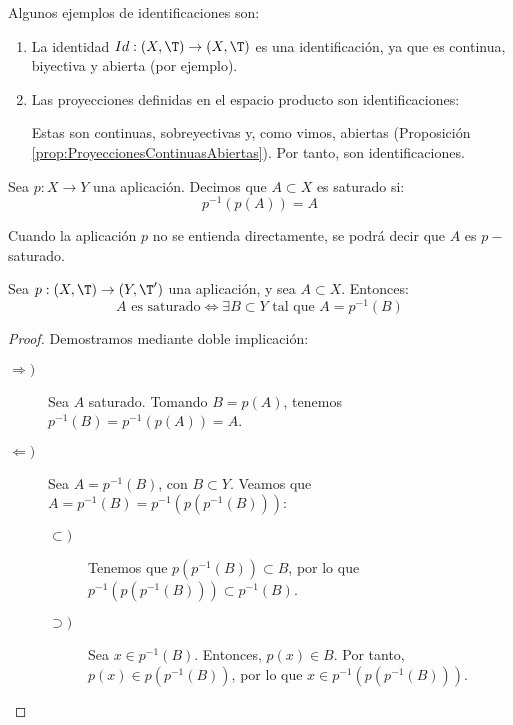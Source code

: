 \begin{ejemplo} Algunos ejemplos de identificaciones son:
\begin{enumerate}
    \item La identidad $Id:(X,\T)\to (X,\T)$ es una identificación, ya que es continua, biyectiva y abierta (por ejemplo).
    \item Las proyecciones definidas en el espacio producto son identificaciones:

        Estas son continuas, sobreyectivas y, como vimos, abiertas (Proposición \ref{prop:ProyeccionesContinuasAbiertas}). Por tanto, son identificaciones.
\end{enumerate}
\end{ejemplo}


\begin{definicion}
    Sea $p:X\to Y$ una aplicación. Decimos que $A\subset X$ es saturado si:
    \begin{equation*}
        p^{-1}(p(A))=A
    \end{equation*}

    Cuando la aplicación $p$ no se entienda directamente, se podrá decir que $A$ es $p-$saturado.
\end{definicion}
\begin{prop}
    Sea $p:(X,\T)\to (Y,\T')$ una aplicación, y sea $A\subset X$. Entonces:
    \begin{equation*}
        A \text{ es saturado} \Longleftrightarrow \exists B\subset Y \text{ tal que } A=p^{-1}(B)
    \end{equation*}
\end{prop}
\begin{proof}
    Demostramos mediante doble implicación:
    \begin{description}
        \item[$\Longrightarrow)$] Sea $A$ saturado. Tomando $B=p(A)$, tenemos $p^{-1}(B)=p^{-1}(p(A))=A$.
        \item[$\Longleftarrow)$] Sea $A=p^{-1}(B)$, con $B\subset Y$. Veamos que $A=p^{-1}(B) = p^{-1}(p(p^{-1}(B)))$:
        \begin{description}
            \item[$\subset)$] Tenemos que $p(p^{-1}(B))\subset B$, por lo que
            $p^{-1}(p(p^{-1}(B)))\subset p^{-1}(B)$.

            \item[$\supset)$] Sea $x\in p^{-1}(B)$. Entonces,
            $p(x)\in B$. Por tanto, $p(x)\in p(p^{-1}(B))$, por lo que
            $x\in p^{-1}(p(p^{-1}(B)))$.
        \end{description}
    \end{description}
\end{proof}


